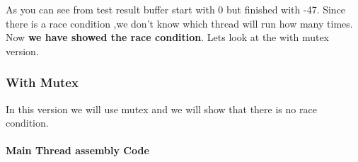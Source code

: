 \documentclass{article}
\begin{document}
\hfill \break
\hfill \break
As you can see from test result buffer start with 0 but finished with -47. Since there is a race condition ,we don't know which
thread will run how many times. Now \textbf{we have showed the race condition}. Lets look at the with mutex version.
\cleardoublepage
\subsubsection{With Mutex}
In this version we will use mutex and we will show that there is no race condition. \\ \\
\textbf{Main Thread assembly Code} \\
\begin{figure}[H]
    \centering
    \qquad

\end{figure}
\end{document}
